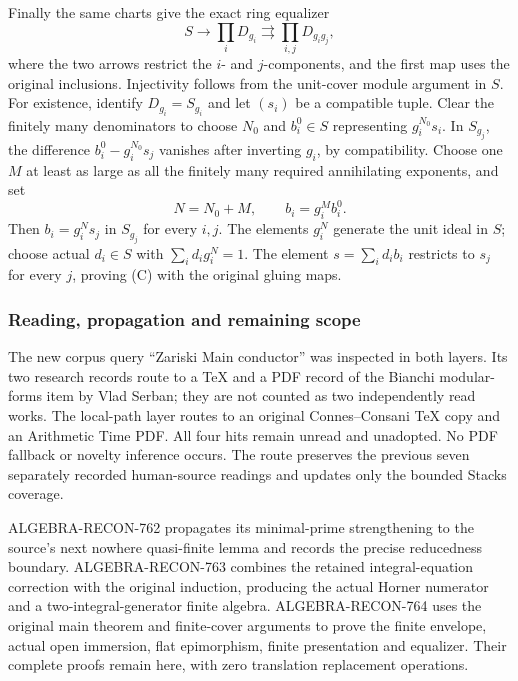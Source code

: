 Finally the same charts give the exact ring equalizer \[
 S\longrightarrow\prod_iD_{g_i}
       \rightrightarrows\prod_{i,j}D_{g_ig_j},
 \tag{C}
\] where the two arrows restrict the \(i\)- and \(j\)-components, and the first map uses the original inclusions. Injectivity follows from the unit-cover module argument in \(S\). For existence, identify \(D_{g_i}=S_{g_i}\) and let \((s_i)\) be a compatible tuple. Clear the finitely many denominators to choose \(N_0\) and \(b_i^0\in S\) representing \(g_i^{N_0}s_i\). In \(S_{g_j}\), the difference \(b_i^0-g_i^{N_0}s_j\) vanishes after inverting \(g_i\), by compatibility. Choose one \(M\) at least as large as all the finitely many required annihilating exponents, and set \[
 N=N_0+M,\qquad b_i=g_i^M b_i^0.
\] Then \(b_i=g_i^N s_j\) in \(S_{g_j}\) for every \(i,j\). The elements \(g_i^N\) generate the unit ideal in \(S\); choose actual \(d_i\in S\) with \(\sum_i d_i g_i^N=1\). The element \(s=\sum_i d_i b_i\) restricts to \(s_j\) for every \(j\), proving (C) with the original gluing maps.

\subsubsection{Reading, propagation and remaining scope}\label{algebra-proof-032-reading-propagation-and-remaining-scope}

The new corpus query ``Zariski Main conductor'' was inspected in both layers. Its two research records route to a TeX and a PDF record of the Bianchi modular-forms item by Vlad Serban; they are not counted as two independently read works. The local-path layer routes to an original Connes--Consani TeX copy and an Arithmetic Time PDF. All four hits remain unread and unadopted. No PDF fallback or novelty inference occurs. The route preserves the previous seven separately recorded human-source readings and updates only the bounded Stacks coverage.

ALGEBRA-\AlgebraIdentifierBreak{}RECON-\AlgebraIdentifierBreak{}762 propagates its minimal-prime strengthening to the source's next nowhere quasi-finite lemma and records the precise reducedness boundary. ALGEBRA-\AlgebraIdentifierBreak{}RECON-\AlgebraIdentifierBreak{}763 combines the retained integral-equation correction with the original induction, producing the actual Horner numerator and a two-integral-generator finite algebra. ALGEBRA-\AlgebraIdentifierBreak{}RECON-\AlgebraIdentifierBreak{}764 uses the original main theorem and finite-cover arguments to prove the finite envelope, actual open immersion, flat epimorphism, finite presentation and equalizer. Their complete proofs remain here, with zero translation replacement operations.

